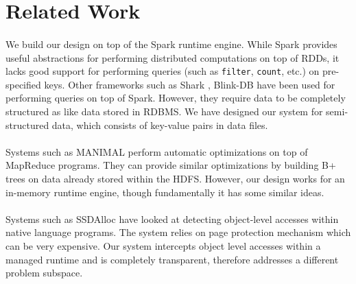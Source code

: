 \section{Related Work}
\label{sec:related}
\paragraph{}
We build our design on top of the Spark \cite{zaharia2012resilient}
runtime engine. While Spark provides useful abstractions for performing
distributed computations on top of RDDs, it lacks good support for
performing queries (such as \texttt{filter}, \texttt{count}, etc.) on
pre-specified keys.  Other frameworks such as Shark
\cite{engle2012shark}, Blink-DB \cite{agarwal2013blinkdb} have been used
for performing queries on top of Spark. However, they require data to be
completely structured as like data stored in RDBMS. We have designed our
system for semi-structured data, which consists of key-value pairs in
data files. 

\paragraph{}
Systems such as MANIMAL \cite{jahani2011automatic} perform automatic
optimizations on top of MapReduce programs. They can provide similar
optimizations by building B+ trees on data already stored within the
HDFS. However, our design works for an in-memory runtime engine, though
fundamentally it has some similar ideas.

\paragraph{}
Systems such as SSDAlloc\cite{badam2011ssdalloc} have looked at
detecting object-level accesses within native language programs. The
system relies on page protection mechanism which can be very expensive.
Our system intercepts object level accesses within a managed runtime and
is completely transparent, therefore addresses a different problem
subspace.
